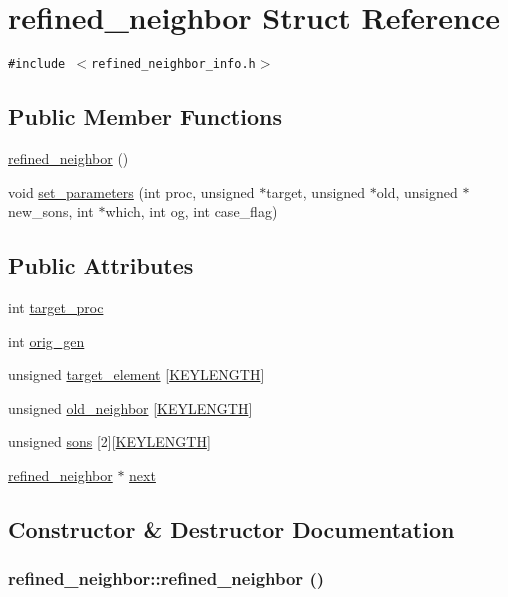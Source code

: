 \hypertarget{structrefined__neighbor}{
\section{refined\_\-neighbor Struct Reference}
\label{structrefined__neighbor}
}
{\tt \#include $<$refined\_\-neighbor\_\-info.h$>$}

\subsection*{Public Member Functions}
\begin{CompactItemize}
\item 
\hyperlink{structrefined__neighbor_a0}{refined\_\-neighbor} ()
\item 
void \hyperlink{structrefined__neighbor_a1}{set\_\-parameters} (int proc, unsigned $\ast$target, unsigned $\ast$old, unsigned $\ast$new\_\-sons, int $\ast$which, int og, int case\_\-flag)
\end{CompactItemize}
\subsection*{Public Attributes}
\begin{CompactItemize}
\item 
int \hyperlink{structrefined__neighbor_o0}{target\_\-proc}
\item 
int \hyperlink{structrefined__neighbor_o1}{orig\_\-gen}
\item 
unsigned \hyperlink{structrefined__neighbor_o2}{target\_\-element} \mbox{[}\hyperlink{constant_8h_a10}{KEYLENGTH}\mbox{]}
\item 
unsigned \hyperlink{structrefined__neighbor_o3}{old\_\-neighbor} \mbox{[}\hyperlink{constant_8h_a10}{KEYLENGTH}\mbox{]}
\item 
unsigned \hyperlink{structrefined__neighbor_o4}{sons} \mbox{[}2\mbox{]}\mbox{[}\hyperlink{constant_8h_a10}{KEYLENGTH}\mbox{]}
\item 
\hyperlink{structrefined__neighbor}{refined\_\-neighbor} $\ast$ \hyperlink{structrefined__neighbor_o5}{next}
\end{CompactItemize}


\subsection{Constructor \& Destructor Documentation}
\hypertarget{structrefined__neighbor_a0}{
\subsubsection[refined\_\-neighbor]{\setlength{\rightskip}{0pt plus 5cm}refined\_\-neighbor::refined\_\-neighbor ()}}
\label{structrefined__neighbor_a0}




